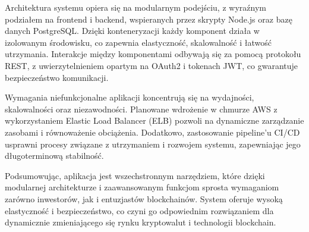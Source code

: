 Architektura systemu opiera się na modularnym podejściu, z wyraźnym podziałem na frontend i backend, wspieranych przez skrypty Node.js oraz bazę danych PostgreSQL. Dzięki konteneryzacji każdy komponent działa w izolowanym środowisku, co zapewnia elastyczność, skalowalność i łatwość utrzymania. Interakcje między komponentami odbywają się za pomocą protokołu REST, z uwierzytelnieniem opartym na OAuth2 i tokenach JWT, co gwarantuje bezpieczeństwo komunikacji.

Wymagania niefunkcjonalne aplikacji koncentrują się na wydajności, skalowalności oraz niezawodności. Planowane wdrożenie w chmurze AWS z wykorzystaniem Elastic Load Balancer (ELB) pozwoli na dynamiczne zarządzanie zasobami i równoważenie obciążenia. Dodatkowo, zastosowanie pipeline’u CI/CD usprawni procesy związane z utrzymaniem i rozwojem systemu, zapewniając jego długoterminową stabilność.

Podsumowując, aplikacja jest wszechstronnym narzędziem, które dzięki modularnej architekturze i zaawansowanym funkcjom sprosta wymaganiom zarówno inwestorów, jak i entuzjastów blockchainów. System oferuje wysoką elastyczność i bezpieczeństwo, co czyni go odpowiednim rozwiązaniem dla dynamicznie zmieniającego się rynku kryptowalut i technologii blockchain.

